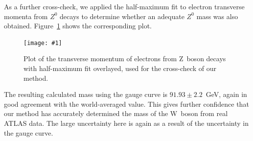 \documentclass[twocolumn]{article}
\newcommand{\insertFigure}[1]{%
   \texttt{[image: \#1]}%
}
\begin{document}
\par As a further cross-check, we applied the half-maximum fit to electron transverse momenta from $Z^0$ decays to determine whether an adequate $Z^0$ mass was also obtained. Figure~\ref{fig:crosscheck} shows the corresponding plot. 
\begin{figure}[!h]
\centering
\insertFigure{Images/ZeeCheckLabeled.png}
\caption{Plot of the transverse momentum of electrons from Z~boson decays with half-maximum fit overlayed, used for the cross-check of our method.}
\label{fig:crosscheck}
\end{figure}
The resulting calculated mass using the gauge curve is $91.93 \pm 2.2$~GeV, again in good agreement with the world-averaged value. This gives further confidence that our method has accurately determined the mass of the W~boson from real ATLAS data. The large uncertainty here is again as a result of the uncertainty in the gauge curve.
\end{document}
